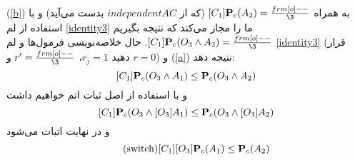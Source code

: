 (\ref{b})
 به همراه $ [C_1]\mbP_c(A_2)=\frac{\1}{\3} $
(که از $independentAC$ بدست می‌آید) و با استفاده از لم \ref{identity3} ما را مجاز می‌کند که نتیجه بگیریم $ [C_1]\mbP_c(O_3\wedge A_2)=\frac{\1}{\3} $. حال خلاصه‌نویسی فرمول‌ها و لم \ref{identity3} (قرار دهید $ r_j=1 $، $ r'=\frac{\1}{\3} $ و $ r=0 $) و (\ref{a}) نتیجه دهد:
$$[C_1]\mathbf{P}_c(O_3\wedge A_1)\leq\mathbf{P}_c(O_3\wedge A_2)$$
و با استفاده از اصل ثبات اتم خواهیم داشت
\begin{equation}\label{c}
[C_1]\mathbf{P}_c(O_3\wedge[O_3]A_1)\leq\mathbf{P}_c(O_3\wedge[O_3]A_2)
\end{equation}
و در نهایت اثبات می‌شود
\begin{equation}\tag{switch}
[C_1][O_3]\mathbf{P}_c(A_1)\leq\mathbf{P}_c(A_2)
\end{equation}